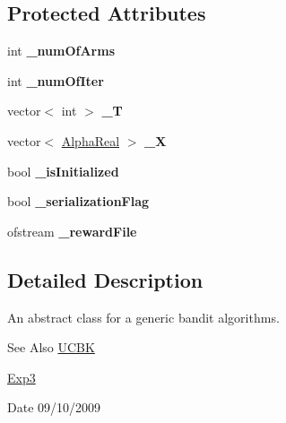 \subsection*{Protected Attributes}
\begin{DoxyCompactItemize}
\item 
\hypertarget{classMultiBoost_1_1GenericBanditAlgorithm_a191713eadb636f964d6896a52ec5f2ff}{int {\bfseries \-\_\-num\-Of\-Arms}}\label{classMultiBoost_1_1GenericBanditAlgorithm_a191713eadb636f964d6896a52ec5f2ff}

\item 
\hypertarget{classMultiBoost_1_1GenericBanditAlgorithm_ad742967767246e189f0ac36763a496d3}{int {\bfseries \-\_\-num\-Of\-Iter}}\label{classMultiBoost_1_1GenericBanditAlgorithm_ad742967767246e189f0ac36763a496d3}

\item 
\hypertarget{classMultiBoost_1_1GenericBanditAlgorithm_ac4ee3e2a561c0372a9ffc3bc6d27f579}{vector$<$ int $>$ {\bfseries \-\_\-\-T}}\label{classMultiBoost_1_1GenericBanditAlgorithm_ac4ee3e2a561c0372a9ffc3bc6d27f579}

\item 
\hypertarget{classMultiBoost_1_1GenericBanditAlgorithm_ae8a8a2a02fe325ab82c12e3261e477fc}{vector$<$ \hyperlink{Defaults_8h_a80184c4fd10ab70a1a17c5f97dcd1563}{Alpha\-Real} $>$ {\bfseries \-\_\-\-X}}\label{classMultiBoost_1_1GenericBanditAlgorithm_ae8a8a2a02fe325ab82c12e3261e477fc}

\item 
\hypertarget{classMultiBoost_1_1GenericBanditAlgorithm_ac8a81d85b5e42ddbf29ece9dedb2012e}{bool {\bfseries \-\_\-is\-Initialized}}\label{classMultiBoost_1_1GenericBanditAlgorithm_ac8a81d85b5e42ddbf29ece9dedb2012e}

\item 
\hypertarget{classMultiBoost_1_1GenericBanditAlgorithm_a475f3c78af935342a697bb516bc55e85}{bool {\bfseries \-\_\-serialization\-Flag}}\label{classMultiBoost_1_1GenericBanditAlgorithm_a475f3c78af935342a697bb516bc55e85}

\item 
\hypertarget{classMultiBoost_1_1GenericBanditAlgorithm_a816a29ad42fedab3e97dfcbc689de6b1}{ofstream {\bfseries \-\_\-reward\-File}}\label{classMultiBoost_1_1GenericBanditAlgorithm_a816a29ad42fedab3e97dfcbc689de6b1}

\end{DoxyCompactItemize}


\subsection{Detailed Description}
An abstract class for a generic bandit algorithms. \begin{DoxySeeAlso}{See Also}
\hyperlink{classMultiBoost_1_1UCBK}{U\-C\-B\-K} 

\hyperlink{classMultiBoost_1_1Exp3}{Exp3} 
\end{DoxySeeAlso}
\begin{DoxyDate}{Date}
09/10/2009 
\end{DoxyDate}


